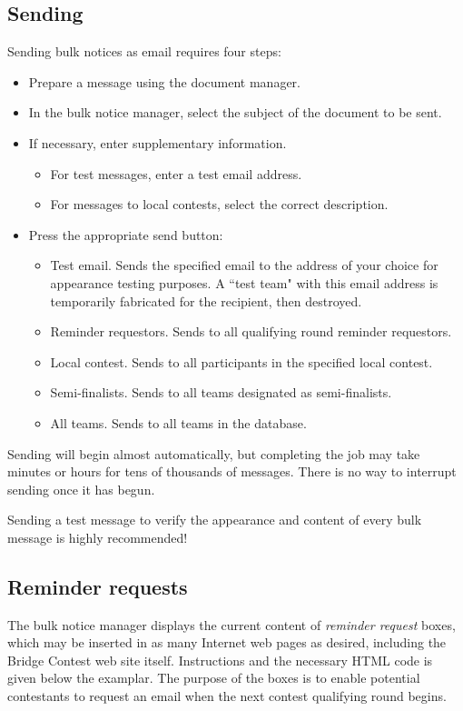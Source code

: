 \documentclass[11pt,letterpaper]{refart}
\def\ui#1{\textsf{#1}}
\begin{document}
\subsection{Sending}
Sending bulk notices as email requires four steps:
\begin{itemize}
\item Prepare a message using the document manager.
\item In the bulk notice manager, select the subject of the document to be sent.
\item If necessary, enter supplementary information. 
  \begin{itemize}
  \item For test messages, enter a test email address.
  \item For messages to local contests, select the correct description.
  \end{itemize}
\item Press the appropriate send button:   
  \begin{itemize}
  \item \ui{Test email}. Sends the specified email to the address of your choice
    for appearance testing purposes. A ``test team" with this email address
    is temporarily fabricated for the recipient, then destroyed.
  \item \ui{Reminder requestors}. Sends to all qualifying round reminder requestors.
  \item \ui{Local contest}. Sends to all participants in the specified local contest.
  \item \ui{Semi-finalists}. Sends to all teams designated as semi-finalists.
  \item \ui{All teams}. Sends to all teams in the database.
  \end{itemize}
\end{itemize}
Sending will begin almost automatically, but completing the job may
take minutes or hours for tens of thousands of messages. There is no
way to interrupt sending once it has begun.

Sending a test message to verify the appearance and content of every
bulk message is highly recommended!

\subsection{Reminder requests}
The bulk notice manager displays the current content of \emph{reminder
  request} boxes, which may be inserted in as many Internet web pages
as desired, including the Bridge Contest web site itself.
Instructions and the necessary HTML code is given below the
examplar. The purpose of the boxes is to enable potential contestants
to request an email when the next contest qualifying round begins.
\end{document}
